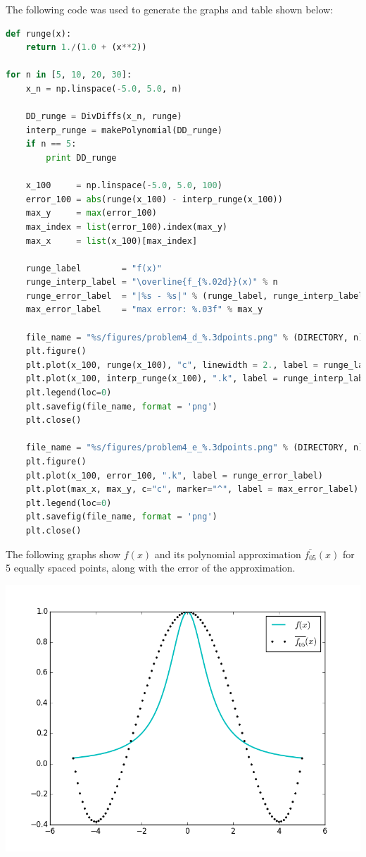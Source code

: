 \documentclass[12pt]{article}
\begin{document}
\noindent The following code was used to generate the graphs and table shown below:
\begin{lstlisting}[language=Python, caption=Problem 4]
def runge(x):
    return 1./(1.0 + (x**2))

for n in [5, 10, 20, 30]:
    x_n = np.linspace(-5.0, 5.0, n)
    
    DD_runge = DivDiffs(x_n, runge)
    interp_runge = makePolynomial(DD_runge)
    if n == 5:
        print DD_runge
    
    x_100     = np.linspace(-5.0, 5.0, 100)
    error_100 = abs(runge(x_100) - interp_runge(x_100))
    max_y     = max(error_100)
    max_index = list(error_100).index(max_y)
    max_x     = list(x_100)[max_index]
    
    runge_label        = "f(x)"
    runge_interp_label = "\overline{f_{%.02d}}(x)" % n
    runge_error_label  = "|%s - %s|" % (runge_label, runge_interp_label)
    max_error_label    = "max error: %.03f" % max_y
    
    file_name = "%s/figures/problem4_d_%.3dpoints.png" % (DIRECTORY, n)
    plt.figure()
    plt.plot(x_100, runge(x_100), "c", linewidth = 2., label = runge_label)
    plt.plot(x_100, interp_runge(x_100), ".k", label = runge_interp_label)
    plt.legend(loc=0)
    plt.savefig(file_name, format = 'png')
    plt.close()
    
    file_name = "%s/figures/problem4_e_%.3dpoints.png" % (DIRECTORY, n)
    plt.figure()
    plt.plot(x_100, error_100, ".k", label = runge_error_label)
    plt.plot(max_x, max_y, c="c", marker="^", label = max_error_label)
    plt.legend(loc=0)
    plt.savefig(file_name, format = 'png')
    plt.close()
\end{lstlisting}
The following graphs show $f(x)$ and its polynomial approximation $\overline{f_{05}}(x)$ for 5 equally spaced points, along with the error of the approximation.\\
\centerline{\includegraphics[scale=0.65]{figures/problem4_d_005points.png}}\\
\end{document}
